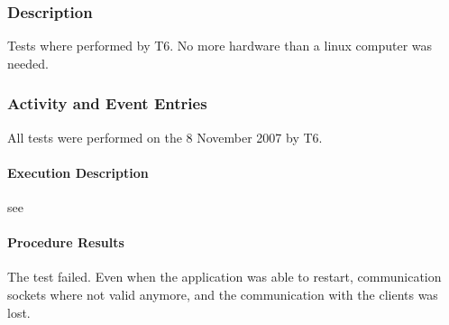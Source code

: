 





\subsubsection{Description}
Tests where performed by T6. No more hardware than a linux computer was needed.

\subsubsection{Activity and Event Entries}
All tests were performed on the 8 November 2007 by T6.


\paragraph{Execution Description}
see 


\paragraph{Procedure Results}
The test failed. Even when the application was able to restart, communication sockets where not valid anymore, and the communication with the clients was lost.

